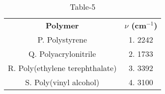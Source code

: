 \begin{table}[htbp]
  \centering
  \caption{Table-5}
  \label{table5}
  \begin{tabular}{cc}
\textbf{Polymer} & \textbf{$\nu$ (cm$^{-1}$)}\\

P. Polystyrene & 1. 2242\\
Q. Polyacrylonitrile & 2. 1733\\
R. Poly(ethylene terephthalate) & 3. 3392\\
S. Poly(vinyl alcohol) & 4. 3100\\
  
  
  
  \end{tabular}
\end{table}